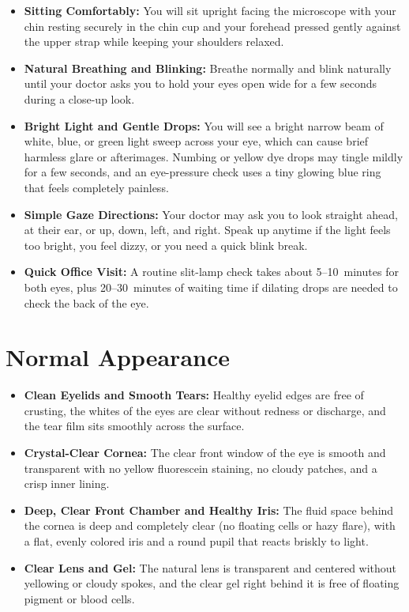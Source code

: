\begin{itemize}
    \item \textbf{Sitting Comfortably:} You will sit upright facing the microscope with your chin resting securely in the chin cup and your forehead pressed gently against the upper strap while keeping your shoulders relaxed.
    \item \textbf{Natural Breathing and Blinking:} Breathe normally and blink naturally until your doctor asks you to hold your eyes open wide for a few seconds during a close-up look.
    \item \textbf{Bright Light and Gentle Drops:} You will see a bright narrow beam of white, blue, or green light sweep across your eye, which can cause brief harmless glare or afterimages. Numbing or yellow dye drops may tingle mildly for a few seconds, and an eye-pressure check uses a tiny glowing blue ring that feels completely painless.
    \item \textbf{Simple Gaze Directions:} Your doctor may ask you to look straight ahead, at their ear, or up, down, left, and right. Speak up anytime if the light feels too bright, you feel dizzy, or you need a quick blink break.
    \item \textbf{Quick Office Visit:} A routine slit-lamp check takes about 5--10~minutes for both eyes, plus 20--30~minutes of waiting time if dilating drops are needed to check the back of the eye.
\end{itemize}

\section{Normal Appearance}

\begin{itemize}
    \item \textbf{Clean Eyelids and Smooth Tears:} Healthy eyelid edges are free of crusting, the whites of the eyes are clear without redness or discharge, and the tear film sits smoothly across the surface.
    \item \textbf{Crystal-Clear Cornea:} The clear front window of the eye is smooth and transparent with no yellow fluorescein staining, no cloudy patches, and a crisp inner lining.
    \item \textbf{Deep, Clear Front Chamber and Healthy Iris:} The fluid space behind the cornea is deep and completely clear (no floating cells or hazy flare), with a flat, evenly colored iris and a round pupil that reacts briskly to light.
    \item \textbf{Clear Lens and Gel:} The natural lens is transparent and centered without yellowing or cloudy spokes, and the clear gel right behind it is free of floating pigment or blood cells.
\end{itemize}


